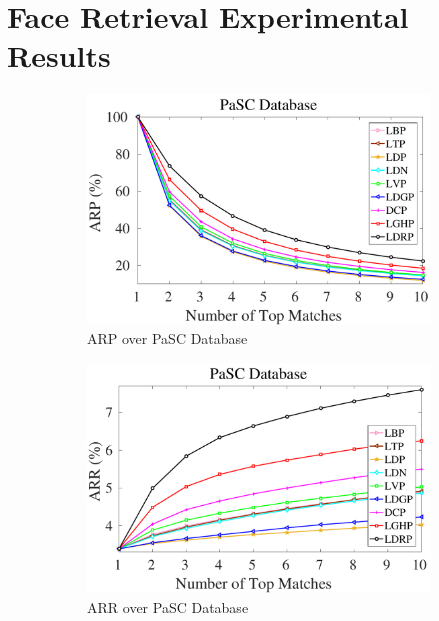 \documentclass[a4paper]{article}
\begin{document}
\section{Face Retrieval Experimental Results}

\begin{figure}[!t]
  \begin{subfigure}{.25\textwidth}
    \centering
    \includegraphics[width=.98\linewidth]{pasc-arp}
    \caption{ARP over PaSC Database}
    \label{fig:pasc-arp}
  \end{subfigure}%
    \begin{subfigure}{.25\textwidth}
    \centering
    \includegraphics[width=.98\linewidth]{pasc-arr}
    \caption{ARR over PaSC Database}
    \label{fig:pasc-arr}
  \end{subfigure}%
    \begin{subfigure}{.25\textwidth}
    \centering

\end{subfigure}
\end{figure}
\end{document}
